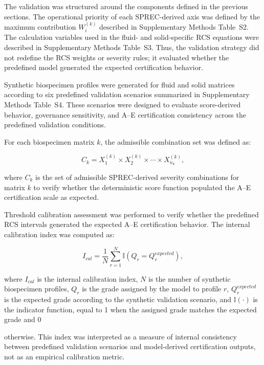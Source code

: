 \documentclass[preprint,12pt]{elsarticle}
\begin{document}
The validation was structured around the components defined in the previous sections. The operational priority of each SPREC-derived axis was defined by the maximum contribution \(W_i^{(k)}\) described in Supplementary Methods Table~S2. The calculation variables used in the fluid- and solid-specific RCS equations were described in Supplementary Methods Table~S3. Thus, the validation strategy did not redefine the RCS weights or severity rules; it evaluated whether the predefined model generated the expected certification behavior.

Synthetic biospecimen profiles were generated for fluid and solid matrices according to six predefined validation scenarios summarized in Supplementary Methods Table~S4. These scenarios were designed to evaluate score-derived behavior, governance sensitivity, and A--E certification consistency across the predefined validation conditions.

For each biospecimen matrix \(k\), the admissible combination set was defined as:

\begin{equation}
C_k = X_1^{(k)} \times X_2^{(k)} \times \cdots \times X_{n_k}^{(k)},
\label{eq:combination_set}
\end{equation}

where \(C_k\) is the set of admissible SPREC-derived severity combinations for matrix \(k\) to verify whether the deterministic score function populated the A--E certification scale as expected.

Threshold calibration assessment was performed to verify whether the predefined RCS intervals generated the expected A--E certification behavior. The internal calibration index was computed 
as:

\begin{equation}
I_{cal} = \frac{1}{N}\sum_{r=1}^{N} \mathbb{I}(Q_r = Q_r^{expected}),
\label{eq:calibration_index}
\end{equation}

where \(I_{cal}\) is the internal calibration index, \(N\) is the number of synthetic biospecimen profiles, \(Q_r\) is the grade assigned by the model to profile \(r\), \(Q_r^{expected}\) is 
the expected grade according to the synthetic validation scenario, and \(\mathbb{I}(\cdot)\) is the indicator function, equal to 1 when the assigned grade matches the expected grade and 0 

otherwise. This index was interpreted as a measure of internal consistency between predefined validation scenarios and model-derived certification outputs, not as an empirical calibration 
metric.
\end{document}
